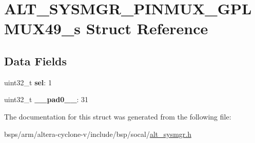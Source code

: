 \hypertarget{structALT__SYSMGR__PINMUX__GPLMUX49__s}{}\section{A\+L\+T\+\_\+\+S\+Y\+S\+M\+G\+R\+\_\+\+P\+I\+N\+M\+U\+X\+\_\+\+G\+P\+L\+M\+U\+X49\+\_\+s Struct Reference}
\label{structALT__SYSMGR__PINMUX__GPLMUX49__s}
\subsection*{Data Fields}
\begin{DoxyCompactItemize}
\item 
\mbox{\label{structALT__SYSMGR__PINMUX__GPLMUX49__s_a1c43f36c317d86f8d91a005696057942}} 
uint32\+\_\+t {\bfseries sel}\+: 1
\item 
\mbox{\label{structALT__SYSMGR__PINMUX__GPLMUX49__s_aba3f1db3d4396e124e8c8eaf48417b27}} 
uint32\+\_\+t {\bfseries \+\_\+\+\_\+pad0\+\_\+\+\_\+}\+: 31
\end{DoxyCompactItemize}


The documentation for this struct was generated from the following file\+:\begin{DoxyCompactItemize}
\item 
bsps/arm/altera-\/cyclone-\/v/include/bsp/socal/\mbox{\hyperlink{alt__sysmgr_8h}{alt\+\_\+sysmgr.\+h}}\end{DoxyCompactItemize}
